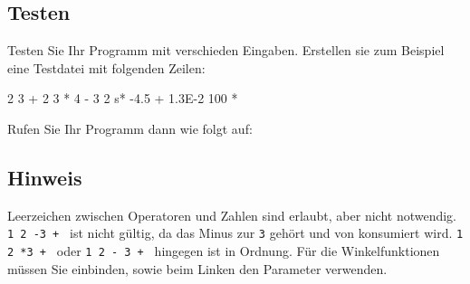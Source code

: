 \subsection*{Testen}
Testen Sie Ihr Programm mit verschieden Eingaben. Erstellen sie zum Beispiel
eine Testdatei  mit folgenden Zeilen:

\begin{osuefmtcode}
  2 3 +
  2 3 * 4 -
  3 2 s* -4.5 +
  1.3E-2 100 *
\end{osuefmtcode}

Rufen Sie Ihr Programm dann wie folgt auf:


\subsection*{Hinweis}
Leerzeichen zwischen Operatoren und Zahlen sind erlaubt, aber nicht notwendig. \verb|1 2 -3 + | ist nicht gültig, da das Minus zur \verb|3| gehört und von  konsumiert wird. \verb|1 2 *3 + | oder \verb|1 2 - 3 + | hingegen ist in Ordnung.
Für die Winkelfunktionen müssen Sie  einbinden, sowie beim Linken den Parameter  verwenden.

\osueguidelinesone


